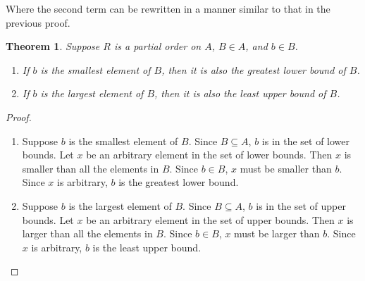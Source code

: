 \documentclass{report}
\newtheorem*{theorem}{Theorem}
\theoremstyle{definition}
\begin{document}
Where the second term can be rewritten in a manner similar to that in the previous proof.
\begin{theorem}
Suppose $R$ is a partial order on $A$, $B\in A$, and $b\in B$.
\begin{enumerate}
\item If $b$ is the smallest element of $B$, then it is also the greatest lower bound of $B$.
\item If $b$ is the largest element of $B$, then it is also the least upper bound of $B$.
\end{enumerate}
\end{theorem}
\begin{proof}\hspace{1mm}
\begin{enumerate}
\item Suppose $b$ is the smallest element of $B$. Since $B\subseteq A$, $b$ is in the set of lower bounds. 
Let $x$ be an arbitrary element in the set of lower bounds. Then $x$ is smaller than all the elements in $B$. Since $b\in B$, $x$ must be smaller than $b$. Since $x$ is arbitrary, $b$ is the
greatest lower bound.
\item Suppose $b$ is the largest element of $B$. Since $B\subseteq A$, $b$ is in the set of upper bounds.
Let $x$ be an arbitrary element in the set of upper bounds. Then $x$ is larger than all the elements in $B$. Since $b\in B$, $x$ must be larger than $b$. Since $x$ is arbitrary, $b$ is the 
least upper bound.\qedhere
\end{enumerate}
\end{proof}
\newpage
\end{document}
